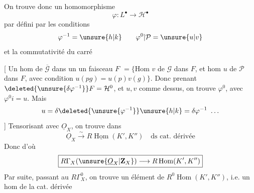 On trouve donc un homomorphisme
\[
\varphi:L^\bullet\longrightarrow\mathcal H^\bullet
\]
par
défini par les conditions
\[
\varphi^{-1}=\unsure{h|k}\qquad\varphi^0\vert\mathcal P=\unsure{u|v}
\]
et la commutativité du carré

[ Un hom de $\overline{\mathcal G}$ dans un un faisceau $F$ $=\{$Hom $v$ de $\mathcal G$ dans $F$, et hom $u$ de $\mathcal P$ dans $F$, avec condition $u(pg)=u(p)v(g)\}$.
Donc prenant $\deleted{\unsure{\delta\varphi^{-1}}}F=\mathcal H^0$, et $u,v$ comme dessus, on trouve $\varphi^0$, avec $\varphi^0i=u$. Mais
\[
u=\delta\deleted{\unsure{\varphi^{-1}}}\unsure{h|k}=\delta\varphi^{-1}\ \ldots
\]
]
Tensorisant avec $\underline O_X$, on trouve
dans
\[
\boxed{\underline O_X\xrightarrow{\sim}R\underline{\operatorname{Hom}}(K',K'')\quad\text{ds cat. dérivée}}
\]
Donc
d'où
\[
\boxed{R\Gamma_X(\unsure{\underline O_X|\mathbf Z_X})\longrightarrow R\operatorname{Hom}(K',K'')}
\]
Par suite,  passant au $R\Gamma_X^0$, on trouve un élément de $R^0\operatorname{Hom}(K',K'')$, i.e. un hom de la cat. dérivée
